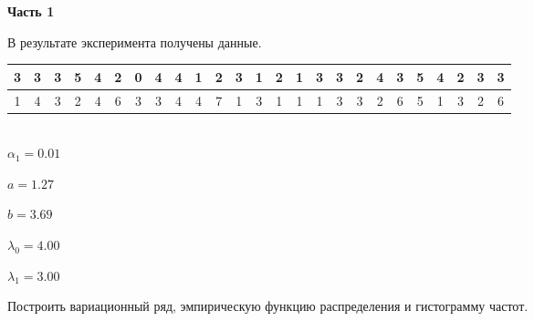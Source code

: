 
\renewcommand*{\proofname}{Решение}
\textbf{Часть 1}

В результате эксперимента получены данные. \\

\begin{tabular}{|c|c|c|c|c|c|c|c|c|c|c|c|c|c|c|c|c|c|c|c|c|c|c|c|c|}
	\hline
	3&3&3&5&4&2&0&4&4&1&2&3&1&2&1&3&3&2&4&3&5&4&2&3&3\\ \hline 1&4&3&2&4&6&3&3&4&4&7&1&3&1&1&1&3&3&2&6&5&1&3&2&6\\
	\hline 
\end{tabular}
\\


	$\alpha_1=0.01$ 
	
	$a = 1.27$ 
	
	$b = 3.69$ 
	
	$\lambda_0=4.00$ 
	
	$\lambda_1=3.00$ \\

\begin{problem}
	Построить вариационный ряд, эмпирическую функцию распределения и гистограмму частот.
\end{problem}

